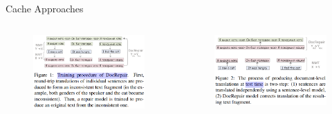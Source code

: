 \begin{frame}{Cache Approaches}
	\begin{columns}[c] %
		\begin{column}{.50\textwidth}
			\begin{figure}
				\centering
				\includegraphics[width=\linewidth]{Images/docrepair_train}
				\label{fig:docrepairtrain}
			\end{figure}
		\end{column}%
		\hfill%
		\begin{column}{.50\textwidth}
			\begin{figure}
				\centering
				\includegraphics[width=\textwidth]{Images/docrepair_test}
				\label{fig:docrepairtest}
			\end{figure}
		\end{column}%
	\end{columns} 
\end{frame}

